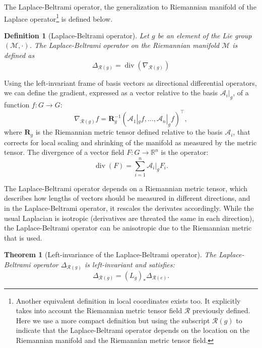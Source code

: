 \documentclass{article}
\newtheorem{definition}{Definition}[section]
\newtheorem{theorem}{Theorem}[section]
\DeclareMathOperator{\dive}{div}
\begin{document}
The Laplace-Beltrami operator, the generalization to Riemannian manifold of the Laplace operator\footnote{Another equivalent definition in local coordinates exists too. It explicitly takes into account the Riemannian metric tensor field $\mathcal{R}$ previously defined. Here we use a more compact definition but using the subscript $\mathcal{R}(g)$ to indicate that the Laplace-Beltrami operator depends on the location on the Riemannian manifold and the Riemannian metric tensor field.} is defined below. 
\begin{definition}[Laplace-Beltrami operator] \label{def:laplace_beltrami}
Let $g$ be an element of the Lie group $(\mathcal{M}, \cdot)$. The Laplace-Beltrami operator on the Riemannian manifold $\mathcal{M}$ is defined as 
\begin{equation}
\Delta_{\mathcal{R}(g)} = \dive (\nabla_{\mathcal{R}(g)})
\end{equation}
\end{definition}

Using the left-invariant frame of basis vectors as directional differential operators, we can define the gradient, expressed as a vector relative to the basis $\mathcal{A}_i|_g$, of a function $f : G \to G$:
\begin{equation}
\nabla_{\mathcal{R}(g)} f = \mathbf{R}_{g}^{-1} (\mathcal{A}_1|_g f, \dots, \mathcal{A}_n|_g f)^\top,
\end{equation}
where $\mathbf{R}_{g}$ is the Riemannian metric tensor defined relative to the basis $\mathcal{A}_i$, that corrects for local scaling and shrinking of the manifold as measured by the metric tensor.
The divergence of a vector field $F : G \to \mathbb{R}^n$ is the operator:
\begin{equation}
\dive(F) = \sum_{i=1}^n \mathcal{A}_i|_g F_i.
\end{equation}

The Laplace-Beltrami operator depends on a Riemannian metric tensor, which describes how lengths of vectors should be measured in different directions, and in the Laplace-Beltrami operator, it rescales the derivates accordingly. While the usual Laplacian is isotropic (derivatives are threated the same in each direction), the Laplace-Beltrami operator can be anisotropic due to the Riemannian metric that is used.

\begin{theorem}[Left-invariance of the Laplace-Beltrami operator] \label{thm:equiv_laplace_beltrami}
The Laplace-Beltrami operator $\Delta_{\mathcal{R}(g)}$ is left-invariant and satisfies:
\begin{equation}
\Delta_{\mathcal{R}(g)} = (L_g)_* \Delta_{\mathcal{R}(e)}.
\end{equation}
\end{theorem}
\end{document}
